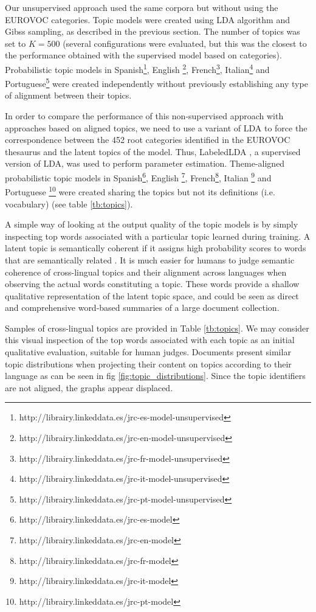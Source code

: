  Our unsupervised approach used the same corpora but without using the EUROVOC categories. Topic models were created using LDA algorithm and Gibss sampling, as described in the previous section. The number of topics was set to $K=500$ (several configurations were evaluated, but this was the closest to the performance obtained with the supervised model based on categories). Probabilistic topic models in Spanish\footnote{http://librairy.linkeddata.es/jrc-es-model-unsupervised}, English \footnote{http://librairy.linkeddata.es/jrc-en-model-unsupervised}, French\footnote{http://librairy.linkeddata.es/jrc-fr-model-unsupervised}, Italian\footnote{http://librairy.linkeddata.es/jrc-it-model-unsupervised} and Portuguese\footnote{http://librairy.linkeddata.es/jrc-pt-model-unsupervised} were created independently without previously establishing any type of alignment between their topics. 
 
 In order to compare the performance of this non-supervised approach with approaches based on aligned topics, we need to use a variant of LDA to force the correspondence between the 452 root categories identified in the EUROVOC thesaurus and the latent topics of the model. Thus, LabeledLDA \citep{Ramage2009a}, a supervised version of LDA, was used to perform parameter estimation. Theme-aligned probabilistic topic models in Spanish\footnote{http://librairy.linkeddata.es/jrc-es-model}, English \footnote{http://librairy.linkeddata.es/jrc-en-model}, French\footnote{http://librairy.linkeddata.es/jrc-fr-model}, Italian \footnote{http://librairy.linkeddata.es/jrc-it-model} and Portuguese \footnote{http://librairy.linkeddata.es/jrc-pt-model} were created sharing the topics but not its definitions (i.e. vocabulary) (see table \ref{tb:topics}).

A simple way of looking at the output quality of the topic models is by simply inspecting top words associated with a particular topic learned during training. A latent topic is semantically coherent if it assigns high probability scores to words that are semantically related \citep{Gliozzo2007, newman-etal-2010-automatic, mimno-etal-2011-optimizing}. It is much easier for humans to judge semantic coherence of cross-lingual topics and their alignment across languages when observing the actual words constituting a topic. These words provide a shallow qualitative representation of the latent topic space, and could be seen as direct and comprehensive word-based summaries of a large document collection.

Samples of cross-lingual topics are provided in Table \ref{tb:topics}. We may consider this visual inspection of the top words associated with each topic as an initial qualitative evaluation, suitable for human judges. Documents present similar topic distributions when projecting their content on topics according to their language as can be seen in fig \ref{fig:topic_distributions}. Since the topic identifiers are not aligned, the graphs appear displaced.

